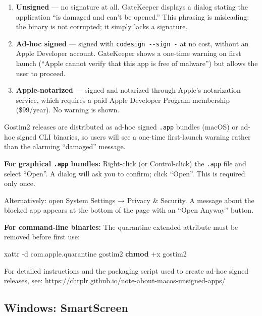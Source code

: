 \documentclass[
  11pt,
]{article}
\newenvironment{Shaded}{\begin{snugshade}}{\end{snugshade}}
\newcommand{\AttributeTok}[1]{\textcolor[rgb]{0.13,0.29,0.53}{#1}}
\newcommand{\ExtensionTok}[1]{#1}
\newcommand{\FunctionTok}[1]{\textcolor[rgb]{0.13,0.29,0.53}{\textbf{#1}}}
\newcommand{\NormalTok}[1]{#1}
\providecommand{\tightlist}{%
  \setlength{\itemsep}{0pt}\setlength{\parskip}{0pt}}
\begin{document}
\begin{enumerate}
\def\labelenumi{\arabic{enumi}.}
\tightlist
\item
  \textbf{Unsigned} --- no signature at all. GateKeeper displays a
  dialog stating the application ``is damaged and can't be opened.''
  This phrasing is misleading: the binary is not corrupted; it simply
  lacks a signature.
\item
  \textbf{Ad-hoc signed} --- signed with \texttt{codesign\ -\/-sign\ -}
  at no cost, without an Apple Developer account. GateKeeper shows a
  one-time warning on first launch (``Apple cannot verify that this app
  is free of malware'') but allows the user to proceed.
\item
  \textbf{Apple-notarized} --- signed and notarized through Apple's
  notarization service, which requires a paid Apple Developer Program
  membership (\$99/year). No warning is shown.
\end{enumerate}

Gostim2 releases are distributed as ad-hoc signed \texttt{.app} bundles
(macOS) or ad-hoc signed CLI binaries, so users will see a one-time
first-launch warning rather than the alarming ``damaged'' message.

\textbf{For graphical \texttt{.app} bundles:} Right-click (or
Control-click) the \texttt{.app} file and select ``Open''. A dialog will
ask you to confirm; click ``Open''. This is required only once.

Alternatively: open System Settings → Privacy \& Security. A message
about the blocked app appears at the bottom of the page with an ``Open
Anyway'' button.

\textbf{For command-line binaries:} The quarantine extended attribute
must be removed before first use:

\begin{Shaded}
\begin{Highlighting}[]
\ExtensionTok{xattr} \AttributeTok{{-}d}\NormalTok{ com.apple.quarantine gostim2}
\FunctionTok{chmod}\NormalTok{ +x gostim2}
\end{Highlighting}
\end{Shaded}

For detailed instructions and the packaging script used to create ad-hoc
signed releases, see:
https://chrplr.github.io/note-about-macos-unsigned-apps/

\subsection{Windows: SmartScreen}\label{windows-smartscreen}
\end{document}
